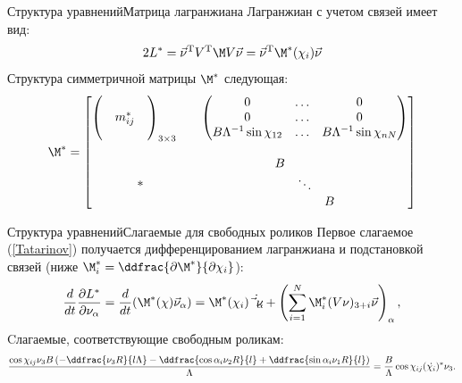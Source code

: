 \begin{frame}{Структура уравнений}{Матрица лагранжиана}    
Лагранжиан с учетом связей имеет вид:
$$ 2L^{*}  = \vec{\nu}^\mathrm{T} V^\mathrm{T}\M V\vec{\nu} = \vec{\nu}^\mathrm{T} \M^*(\chi_i)\vec{\nu} $$
Структура симметричной матрицы $\M^*$ следующая:
$$
\M^* = \begin{bmatrix}
        \left(\begin{matrix}&&\\&m^*_{ij}&\\&&\end{matrix}\right)_{3\times3} \quad & \left(\begin{matrix} 0&\ldots& 0 \\ 0&\ldots&0 \\ B\Lambda^{-1}\sin\chi_{12}&\ldots& B\Lambda^{-1}\sin\chi_{nN} \end{matrix}\right) \\[25pt]
        *          & \begin{matrix} B & & \\ & \ddots & \\ & & B \end{matrix} \\
    \end{bmatrix}
$$
\end{frame}

\begin{frame}{Структура уравнений}{Слагаемые для свободных роликов}    
Первое слагаемое (\ref{Tatarinov}) получается дифференцированием лагранжиана и подстановкой связей (ниже $\M^*_i = \ddfrac{\partial \M^*}{\partial \chi_i}$):
\begin{equation*}
    \frac{d}{dt}\frac{\partial L^{*}}{\partial \nu_\alpha} = \frac{d}{dt}(\M^*(\chi)\vec{\nu}_\alpha) = 
    \M^*(\chi_i)\dot{\vec{\nu}_\alpha} +
    \left(\sum_{i=1}^{N}\M^*_i(V\nu)_{3+i}\vec{\nu}\right)_\alpha,
\end{equation*}
Cлагаемые, соответствующие свободным роликам:
\begin{equation*}
    \frac{\cos\chi_{ij} \nu_3 B \left( -\ddfrac{\nu_3 R}{l \Lambda}-\ddfrac{\cos\alpha_i \nu_2 R}{l}+\ddfrac{\sin\alpha_i \nu_1 R}{l}\right) }{\Lambda} = \frac{B}{\Lambda}\cos\chi_{ij}(\dot{\chi_i})^*\nu_3.
\end{equation*}
\end{frame}

